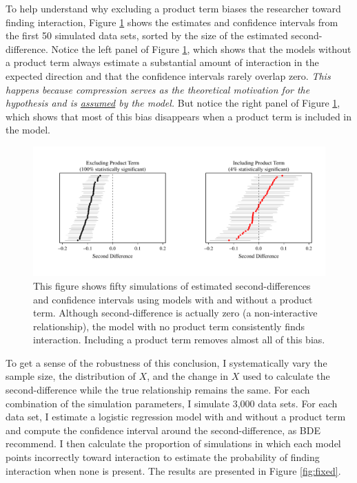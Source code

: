 \documentclass[12pt]{article}
\begin{document}
To help understand why excluding a product term biases the researcher toward finding interaction, Figure \ref{fig:plotted-cis} shows the estimates and confidence intervals from the first 50 simulated data sets, sorted by the size of the estimated second-difference. Notice the left panel of Figure \ref{fig:plotted-cis}, which shows that the models without a product term always estimate a substantial amount of interaction in the expected direction  and that the confidence intervals rarely overlap zero. \textit{This happens because compression serves as the theoretical motivation for the hypothesis and is \underline{assumed} by the model.} But notice the right panel of Figure \ref{fig:plotted-cis}, which shows that most of this bias disappears when a product term is included in the model.

\begin{figure}[h]
\begin{center}
\includegraphics[scale=.7]{fig/fig-plotted-cis.pdf}
\end{center}
\caption{This figure shows fifty simulations of estimated second-differences and confidence intervals using models with and without a product term. Although second-difference is actually zero (a non-interactive relationship), the model with no product term consistently finds interaction. Including a product term removes almost all of this bias.}\label{fig:plotted-cis}
\end{figure}

To get a sense of the robustness of this conclusion, I systematically vary the sample size, the distribution of $X$, and the change in $X$ used to calculate the second-difference while the true relationship remains the same. For each combination of the simulation parameters, I simulate 3,000 data sets. For each data set, I estimate a logistic regression model with and without a product term and compute the confidence interval around the second-difference, as BDE recommend. I then calculate the proportion of simulations in which each model points incorrectly toward interaction to estimate the probability of finding interaction when none is present. The results are presented in Figure \ref{fig:fixed}.
\end{document}
